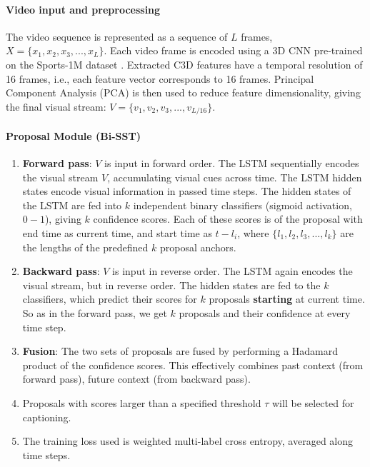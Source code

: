 \paragraph{Video input and preprocessing} 
	
\sloppy The video sequence is represented as a sequence of $L$ frames, $X = \{ x_1, x_2, x_3, ..., x_L \}$. Each video frame is encoded using a 3D CNN pre-trained on the Sports-1M dataset \cite{large-scale-video-classification-cnn}. 
Extracted C3D features have a temporal resolution of 16 frames, i.e., each feature vector 
corresponds to 16 frames. Principal Component Analysis (PCA) is then used to reduce feature 
dimensionality, giving the final visual stream: $V = \{v_1, v_2, v_3, ..., v_{L/16}\}$.

\paragraph{Proposal Module (Bi-SST)}
\begin{enumerate}
\item \textbf{Forward pass}: $V$ is input in forward order. The LSTM sequentially encodes 
the visual stream $V$, accumulating visual cues across time. The LSTM hidden states encode 
visual information in passed time steps. The hidden states of the LSTM are fed into $k$ 
independent binary classifiers (sigmoid activation, $0-1$), giving $k$ confidence scores. 
Each of these scores is of the proposal with end time as current time, and start time as $t 
- l_i$, where $\{l_1, l_2, l_3, ..., l_k\}$ are the lengths of the predefined $k$ proposal 
anchors.

\item\textbf{Backward pass}: $V$ is input in reverse order. The LSTM again encodes the 
visual stream, but in reverse order. The hidden states are fed to the $k$ classifiers, which 
predict their scores for $k$ proposals \textbf{starting} at current time. So as in 
the forward pass, we get $k$ proposals and their confidence at every time step.

\item\textbf{Fusion}: The two sets of proposals are fused by performing a Hadamard 
product of the confidence scores. This effectively combines past context (from forward pass), 
future context (from backward pass).

\item Proposals with scores larger than a specified threshold $\tau$ will be selected for 
captioning.

\item The training loss used is weighted multi-label cross entropy, averaged along time steps.
\end{enumerate}

